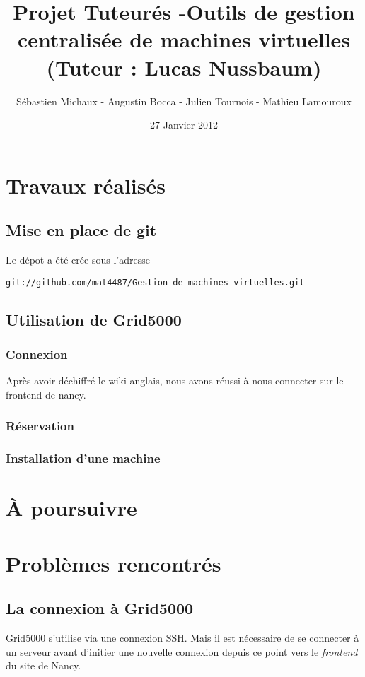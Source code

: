 \documentclass{report}
\begin{document}
\title{Projet Tuteurés -Outils de gestion centralisée de machines virtuelles (Tuteur : Lucas Nussbaum) }
\author{Sébastien Michaux - Augustin Bocca - Julien Tournois - Mathieu Lamouroux}
\date{27 Janvier 2012}
\maketitle
\chapter{Travaux réalisés}
\section{Mise en place de git}
Le dépot a été crée sous l'adresse 
\begin{verbatim}
git://github.com/mat4487/Gestion-de-machines-virtuelles.git
\end{verbatim}
\section{Utilisation de Grid5000}
\subsection{Connexion}
Après avoir déchiffré le wiki anglais, nous avons réussi à nous connecter sur le frontend de nancy.
\subsection{Réservation}
\subsection{Installation d'une machine}
\chapter{À poursuivre}

\chapter{Problèmes rencontrés}
\section{La connexion à Grid5000}
Grid5000 s'utilise via une connexion SSH. Mais il est nécessaire de se connecter à un serveur avant d'initier une nouvelle connexion depuis ce point vers le \emph{frontend} du site de Nancy.
\end{document}
